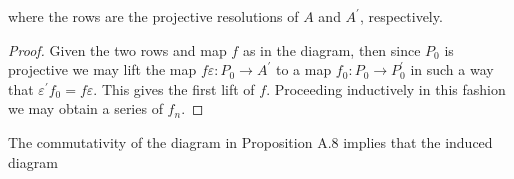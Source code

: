 \begin{proposition}
\begin{center}
\begin{tikzpicture}[x=0.75pt,y=0.75pt,yscale=-1,xscale=1]
\end{tikzpicture}
\end{center}
where the rows are the projective resolutions of $A$ and $A^\prime$, respectively.
\end{proposition}
\begin{proof}
Given the two rows and map $f$ as in the diagram, then since $P_0$ is projective we may lift the map $f\varepsilon:P_0\to A^\prime$ to a map $f_0:P_0\to P_0^\prime$ in such a way that $\varepsilon^\prime f_0=f\varepsilon$. This gives the first lift of $f$. Proceeding inductively in this fashion we may obtain a series of $f_n$.
\end{proof}
The commutativity of the diagram in Proposition A.8 implies that the induced diagram 
\begin{center}



\begin{tikzpicture}[x=0.75pt,y=0.75pt,yscale=-1,xscale=1]


\end{tikzpicture}
\end{center}

